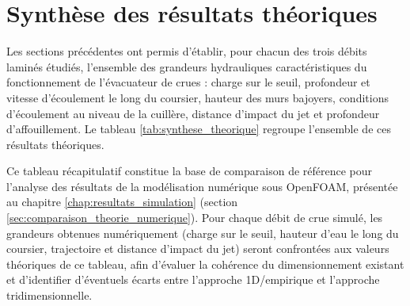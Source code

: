 \section{Synthèse des résultats théoriques}
\label{sec:synthese_resultats_theoriques}

Les sections précédentes ont permis d'établir, pour chacun des trois débits laminés étudiés, l'ensemble des grandeurs hydrauliques caractéristiques du fonctionnement de l'évacuateur de crues : charge sur le seuil, profondeur et vitesse d'écoulement le long du coursier, hauteur des murs bajoyers, conditions d'écoulement au niveau de la cuillère, distance d'impact du jet et profondeur d'affouillement. Le tableau \ref{tab:synthese_theorique} regroupe l'ensemble de ces résultats théoriques.

\begin{table}[H]
    \centering
    \caption{Synthèse des résultats théoriques pour les débits laminés retenus}
    \label{tab:synthese_theorique}
\end{table}

Ce tableau récapitulatif constitue la base de comparaison de référence pour l'analyse des résultats de la modélisation numérique sous OpenFOAM, présentée au chapitre \ref{chap:resultats_simulation} (section \ref{sec:comparaison_theorie_numerique}). Pour chaque débit de crue simulé, les grandeurs obtenues numériquement (charge sur le seuil, hauteur d'eau le long du coursier, trajectoire et distance d'impact du jet) seront confrontées aux valeurs théoriques de ce tableau, afin d'évaluer la cohérence du dimensionnement existant et d'identifier d'éventuels écarts entre l'approche 1D/empirique et l'approche tridimensionnelle.
